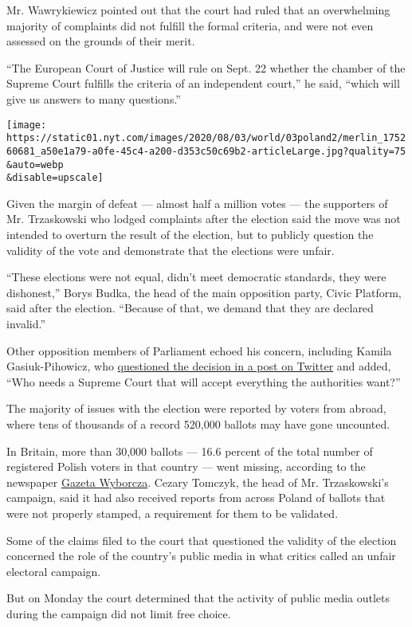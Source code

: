 Mr. Wawrykiewicz pointed out that the court had ruled that an
overwhelming majority of complaints did not fulfill the formal criteria,
and were not even assessed on the grounds of their merit.

``The European Court of Justice will rule on Sept. 22 whether the
chamber of the Supreme Court fulfills the criteria of an independent
court,'' he said, ``which will give us answers to many questions.''

\texttt{[image: https://static01.nyt.com/images/2020/08/03/world/03poland2/merlin\_175260681\_a50e1a79-a0fe-45c4-a200-d353c50c69b2-articleLarge.jpg?quality=75\\\&auto=webp\\\&disable=upscale]}

Given the margin of defeat --- almost half a million votes --- the
supporters of Mr. Trzaskowski who lodged complaints after the election
said the move was not intended to overturn the result of the election,
but to publicly question the validity of the vote and demonstrate that
the elections were unfair.

``These elections were not equal, didn't meet democratic standards, they
were dishonest,'' Borys Budka, the head of the main opposition party,
Civic Platform, said after the election. ``Because of that, we demand
that they are declared invalid.''

Other opposition members of Parliament echoed his concern, including
Kamila Gasiuk-Pihowicz, who
\href{https://twitter.com/Gasiuk_Pihowicz/status/1290250927165673473}{questioned
the decision in a post on Twitter} and added, ``Who needs a Supreme
Court that will accept everything the authorities want?''

The majority of issues with the election were reported by voters from
abroad, where tens of thousands of a record 520,000 ballots may have
gone uncounted.

In Britain, more than 30,000 ballots --- 16.6 percent of the total
number of registered Polish voters in that country --- went missing,
according to the newspaper \href{https://wyborcza.pl/0,0.html}{Gazeta
Wyborcza}. Cezary Tomczyk, the head of Mr. Trzaskowski's campaign, said
it had also received reports from across Poland of ballots that were not
properly stamped, a requirement for them to be validated.

Some of the claims filed to the court that questioned the validity of
the election concerned the role of the country's public media in what
critics called an unfair electoral campaign.

But on Monday the court determined that the activity of public media
outlets during the campaign did not limit free choice.

